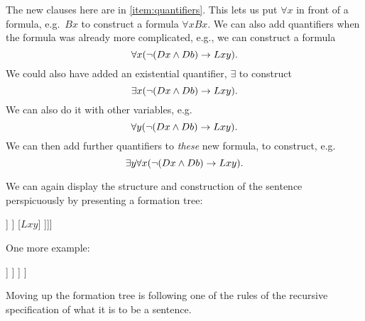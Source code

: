 		The new clauses here are in \ref{item:quantifiers}. This lets us put $\forall x$ in front of a formula, e.g.~$Bx$ to construct a formula $\forall xBx$. We can also add quantifiers when the formula was already more complicated, e.g., we can construct a formula $$\forall x(\neg(Dx\mathbin{\wedge} Db)\rightarrow Lxy).$$ We could also have added an existential quantifier, $\exists$ to construct $$\exists x(\neg(Dx\mathbin{\wedge} Db)\rightarrow Lxy).$$ We can also do it with other variables, e.g. $$\forall y(\neg(Dx\mathbin{\wedge} Db)\rightarrow Lxy).$$ We can then add further quantifiers to \emph{these} new formula, to construct, e.g.~$$\exists y\forall x(\neg(Dx\mathbin{\wedge} Db)\rightarrow Lxy).$$

	We can again display the structure and construction of the sentence perspicuously by presenting a formation tree:

			\begin{center}
			\begin{forest}
				[$\exists y\forall x(\enot(Dx\eand Db)\eif Lxy)$[$\forall x(\enot(Dx\eand Db)\eif Lxy)$[$(\enot(Dx\eand Db)\eif Lxy)$
					[$\enot (Dx\eand Db)$
						[$(Dx\eand Db)$
							[$Dx$]
							[$Db$]
						]
					]
					[$Lxy$]
				]]]
			\end{forest}
			\end{center}

			One more example:

	\begin{center}
	\begin{forest}
		[$\exists z\forall y (Ryz\eand \exists x Qx)$
			[$\forall y (Ryz\eand\exists x Qx)$
				[$(Ryz\eand \exists x Qx)$
					[$Ryz$]
					[$\exists x Qx$
						[$Qx$]
					]
				]
			]
		]
	\end{forest}
	\end{center}
	Moving up the formation tree is following one of the rules of the recursive specification of what it is to be a sentence.




